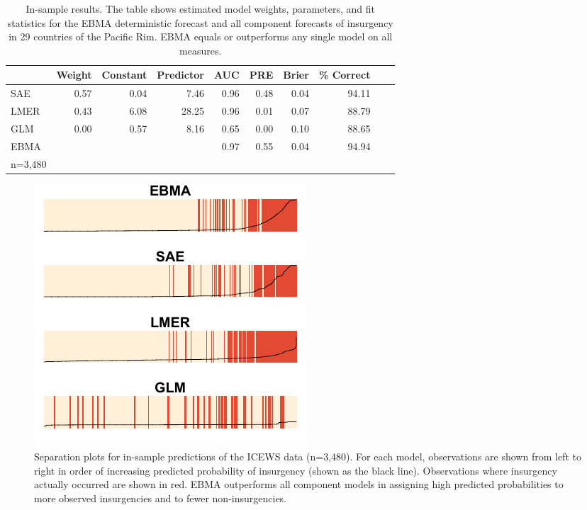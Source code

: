 \documentclass[pdftex,12pt,fullpage,oneside]{amsart}
\begin{document}
\begin{table}[h!]
\small
\begin{center}
  \caption{\footnotesize In-sample results. The table shows estimated
    model weights, parameters, and fit statistics for the EBMA
    deterministic forecast and all component forecasts of insurgency
    in 29 countries of the Pacific Rim. EBMA equals or outperforms any
    single model on all measures.}\label{InSam1}
\begin{tabular}{l rrrrrrrrr}
  \toprule
 & Weight & Constant & Predictor & AUC & PRE & Brier & \% Correct \\ 
  \midrule
  SAE & 0.57 & 0.04 & 7.46 & 0.96 & 0.48 & 0.04 & 94.11\\ 
  LMER & 0.43 & 6.08 & 28.25 & 0.96 & 0.01 & 0.07 & 88.79\\ 
  GLM & 0.00 & 0.57 & 8.16 & 0.65 & 0.00 & 0.10 & 88.65\\ 
  EBMA &  &  &  & 0.97 & 0.55 & 0.04 & 94.94\\ 
   \bottomrule
n=3,480\\
\end{tabular}
\end{center}
\end{table}


\begin{figure}
  \caption{\footnotesize Separation plots for in-sample predictions of
    the ICEWS data (n=3,480). For each model, observations are shown
    from left to right in order of increasing predicted probability of
    insurgency (shown as the black line). Observations where
    insurgency actually occurred are shown in red. EBMA outperforms
    all component models in assigning high predicted probabilities to
    more observed insurgencies and to fewer non-insurgencies.}
\label{InSam1sep}
\begin{center}
\includegraphics[]{Insamplenew.pdf}
\end{center}
\end{figure}
\end{document}

